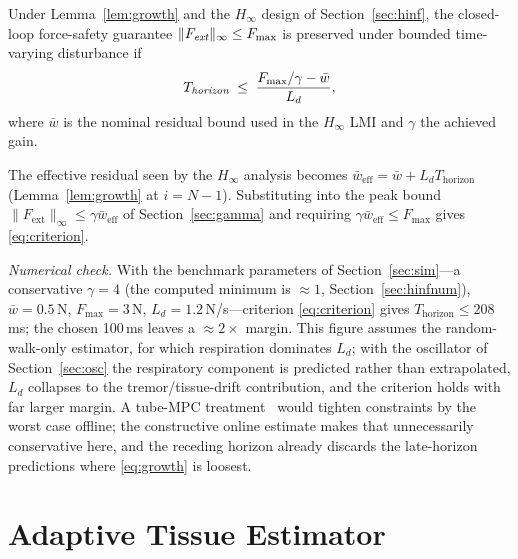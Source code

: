 \begin{theorem}\label{thm:horizon}
Under Lemma~\ref{lem:growth} and the $H_\infty$ design of Section~\ref{sec:hinf}, the closed-loop force-safety guarantee $\|F_{\emph{ext}}\|_\infty \le F_{\max}$ is preserved under bounded time-varying disturbance if
\begin{equation}
T_{\emph{horizon}} \;\le\; \frac{F_{\max}/\gamma - \bar{w}}{L_d},
\label{eq:criterion}
\end{equation}
where $\bar{w}$ is the nominal residual bound used in the $H_\infty$ LMI and $\gamma$ the achieved gain.
\end{theorem}

\begin{IEEEproof}
The effective residual seen by the $H_\infty$ analysis becomes $\bar{w}_{\text{eff}} = \bar{w} + L_d T_{\text{horizon}}$ (Lemma~\ref{lem:growth} at $i=N{-}1$). Substituting into the peak bound $\|F_{\text{ext}}\|_\infty \le \gamma \bar{w}_{\text{eff}}$ of Section~\ref{sec:gamma} and requiring $\gamma \bar{w}_{\text{eff}} \le F_{\max}$ gives \eqref{eq:criterion}.
\end{IEEEproof}

\emph{Numerical check.} With the benchmark parameters of Section~\ref{sec:sim}---a conservative $\gamma = 4$ (the computed minimum is ${\approx}1$, Section~\ref{sec:hinfnum}), $\bar{w} = 0.5$\,N, $F_{\max} = 3$\,N, $L_d = 1.2$\,N/s---criterion \eqref{eq:criterion} gives $T_{\text{horizon}} \le 208$\,ms; the chosen 100\,ms leaves a ${\approx}2\times$ margin. This figure assumes the random-walk-only estimator, for which respiration dominates $L_d$; with the oscillator of Section~\ref{sec:osc} the respiratory component is predicted rather than extrapolated, $L_d$ collapses to the tremor/tissue-drift contribution, and the criterion holds with far larger margin. A tube-MPC treatment~\cite{mayne2005tube} would tighten constraints by the worst case offline; the constructive online estimate makes that unnecessarily conservative here, and the receding horizon already discards the late-horizon predictions where \eqref{eq:growth} is loosest.

\section{Adaptive Tissue Estimator}\label{sec:tissue}

